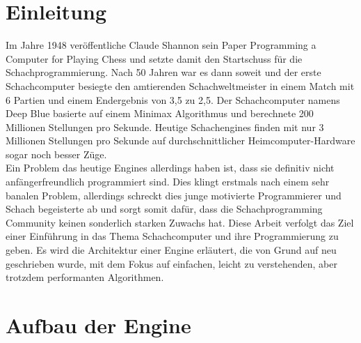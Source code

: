 \documentclass[a4paper, 12pt]{article}
\begin{document}
\section{Einleitung}
Im Jahre 1948 veröffentliche Claude Shannon sein Paper \glqq{}Programming a Computer for Playing Chess\grqq{} und setzte damit den Startschuss für die Schachprogrammierung.
Nach 50 Jahren war es dann soweit und der erste Schachcomputer besiegte den amtierenden Schachweltmeister in einem Match mit 6 Partien und einem Endergebnis von 3,5 zu 2,5.
Der Schachcomputer namens \glqq{}Deep Blue\grqq{} basierte auf einem Minimax Algorithmus und berechnete 200 Millionen Stellungen pro Sekunde.
Heutige Schachengines finden mit nur 3 Millionen Stellungen pro Sekunde auf durchschnittlicher Heimcomputer-Hardware sogar noch besser Züge.\\
Ein Problem das heutige Engines allerdings haben ist, dass sie definitiv nicht anfängerfreundlich programmiert sind. Dies klingt erstmals nach einem sehr banalen Problem, allerdings schreckt dies junge motivierte Programmierer und Schach begeisterte ab und sorgt somit dafür, dass die Schachprogramming Community keinen sonderlich starken Zuwachs hat.
Diese Arbeit verfolgt das Ziel einer Einführung in das Thema Schachcomputer und ihre Programmierung zu geben. Es wird die Architektur einer Engine erläutert, die von Grund auf neu geschrieben wurde, mit dem Fokus auf einfachen, leicht zu verstehenden, aber trotzdem performanten Algorithmen.

\pagebreak
\section{Aufbau der Engine}
\end{document}
